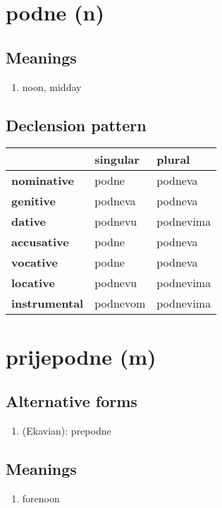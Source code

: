 \filbreak
\section{podne (n)}
\subsection*{Meanings}
\begin{enumerate}
\item noon, midday
\end{enumerate}
\subsection*{Declension pattern}
\begin{tabularx}{\linewidth}{Xll}
\toprule
{} &  singular &     plural \\
\midrule
\textbf{nominative  } &     podne &    podneva \\
\textbf{genitive    } &   podneva &    podneva \\
\textbf{dative      } &   podnevu &  podnevima \\
\textbf{accusative  } &     podne &    podneva \\
\textbf{vocative    } &     podne &    podneva \\
\textbf{locative    } &   podnevu &  podnevima \\
\textbf{instrumental} &  podnevom &  podnevima \\
\bottomrule
\end{tabularx}

\filbreak
\section{prijepodne (m)}
\subsection*{Alternative forms}
\begin{enumerate}
\item (Ekavian): prepodne
\end{enumerate}
\subsection*{Meanings}
\begin{enumerate}
\item forenoon
\end{enumerate}
